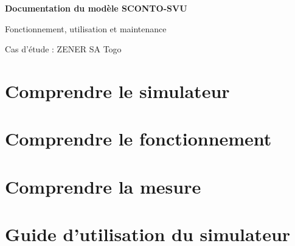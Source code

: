 \documentclass[11pt,oneside]{book}
\begin{document}
\begin{titlepage}
  \centering
  \vspace*{4cm}
  {\DocumentationSans\bfseries\LARGE Documentation du modèle SCONTO-SVU\par}
  \vspace{0.8cm}
  {\DocumentationSans\Large Fonctionnement, utilisation et maintenance\par}
  \vfill
  {\large Cas d'étude : ZENER SA Togo\par}
  \vspace*{2cm}
\end{titlepage}

\frontmatter
\tableofcontents
\listoffigures
\listoftables


\mainmatter

\part{Comprendre le simulateur}




\part{Comprendre le fonctionnement}





\part{Comprendre la mesure}




\part{Guide d'utilisation du simulateur}







\end{document}

